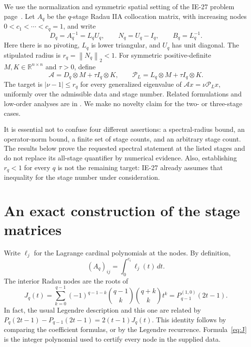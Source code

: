 \documentclass[11pt,letterpaper]{article}
\theoremstyle{remark}
\newcommand{\R}{\mathbb R}
\newcommand{\Id}{I}
\newcommand{\norm}[1]{\left\|#1\right\|_2}
\begin{document}
We use the normalization and symmetric spatial setting of the IE-27 problem
page~\cite{problem}. Let \(A_q\) be the \(q\)-stage Radau IIA collocation matrix,
with increasing nodes \(0<c_1<\cdots<c_q=1\), and write
\begin{equation}\label{eq:factor}
 D_q=A_q^{-1}=L_qU_q,\qquad N_q=U_q-\Id_q,\qquad B_q=L_q^{-1}.
\end{equation}
Here there is no pivoting, \(L_q\) is lower triangular, and \(U_q\) has unit
diagonal. The stipulated radius is \(r_q=\norm{N_q}<1\).
For symmetric positive-definite \(M,K\in\R^{n\times n}\) and \(\tau>0\), define
\begin{equation}\label{eq:pencil}
 \mathcal A=D_q\otimes M+\tau\Id_q\otimes K,
 \qquad \mathcal P_L=L_q\otimes M+\tau\Id_q\otimes K.
\end{equation}
The target is \(|\nu-1|\le r_q\) for every generalized eigenvalue of
\(\mathcal A x=\nu\mathcal P_Lx\), uniformly over the admissible data and stage
number. Related formulations and low-order analyses are in
\cite{dravi,out,axel}. We make no novelty claim for the two- or three-stage
cases.

It is essential not to confuse four different assertions: a spectral-radius
bound, an operator-norm bound, a finite set of stage counts, and an arbitrary
stage count. The results below prove the requested spectral statement at the
listed stages and do not replace its all-stage quantifier by numerical evidence.
Also, establishing \(r_q<1\) for every \(q\) is not the remaining target: IE-27
already assumes that inequality for the stage number under consideration.

\section{An exact construction of the stage matrices}

Write \(\ell_j\) for the Lagrange cardinal polynomials at the nodes. By definition,
\begin{equation}\label{eq:A}
 (A_q)_{ij}=\int_0^{c_i}\ell_j(t)\,dt.
\end{equation}
The interior Radau nodes are the roots of
\begin{equation}\label{eq:J}
 J_q(t)=\sum_{k=0}^{q-1}(-1)^{q-1-k}
 \binom{q-1}{k}\binom{q+k}{k}t^k
       =P_{q-1}^{(1,0)}(2t-1).
\end{equation}
In fact, the usual Legendre description and this one are related by
\(P_q(2t-1)-P_{q-1}(2t-1)=2(t-1)J_q(t)\). This identity follows by comparing
the coefficient formulas, or by the Legendre recurrence. Formula~\eqref{eq:J}
is the integer polynomial used to certify every node in the supplied data.
\end{document}
